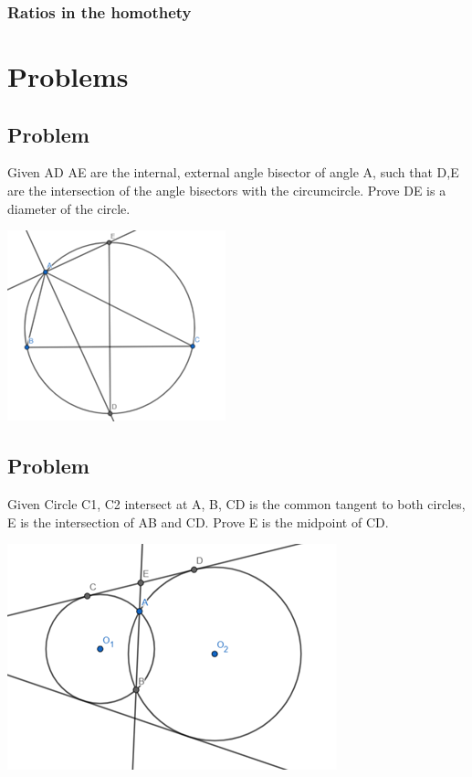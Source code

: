 \documentclass{article}
\begin{document}
\subsubsection{Ratios in the homothety}

\pagebreak

\section{Problems}

\subsection{Problem}
Given AD AE are the internal, external angle bisector of angle A,
 such that D,E are the intersection of the angle bisectors with the circumcircle. 
 Prove DE is a diameter of the circle.

\includegraphics{Picture16.png}

\vspace{50px}

\subsection{Problem}
Given Circle C1, C2 intersect at A, B, CD is the common tangent to both circles, 
E is the intersection of AB and CD. Prove E is the midpoint of CD.

\includegraphics{Picture17.png}
\end{document}
